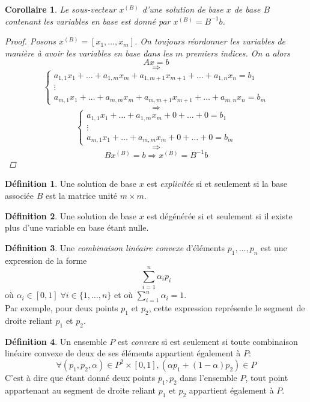 \documentclass[a4paper]{report}
\theoremstyle{definition}
\newtheorem*{definition}{Définition}
\theoremstyle{remark}
\theoremstyle{plain}
\newtheorem{corollary}{Corollaire}
\begin{document}
\begin{corollary}
Le sous-vecteur \(x^{(B)}\) d'une solution de base \(x\) de base \(B\) contenant
les variables en base est donné par \(x^{(B)}=B^{-1}b\).
\begin{proof}
Posons \(x^{(B)}=[x_1,\dots,x_m]\). On toujours réordonner les variables de
manière à avoir les variables en base dans les \(m\) premiers indices. On a
alors
\[Ax=b\]
\[\Rightarrow\]
\[\begin{cases}
	a_{1,1}x_1+\dots+a_{1,m}x_m+a_{1,m+1}x_{m+1}+\dots+a_{1,n}x_n=b_1\\
	\vdots\\
	a_{m,1}x_1+\dots+a_{m,m}x_m+a_{m,m+1}x_{m+1}+\dots+a_{m,n}x_n=b_m
\end{cases}\]
\[\Rightarrow\]
\[\begin{cases}
	a_{1,1}x_1+\dots+a_{1,m}x_m+0+\dots+0=b_1\\
	\vdots\\
	a_{m,1}x_1+\dots+a_{m,m}x_m+0+\dots+0=b_m
\end{cases}\]
\[\Rightarrow\]
\[Bx^{(B)}=b\Rightarrow x^{(B)}=B^{-1}b\]
\end{proof}
\end{corollary}

\begin{definition}
Une solution de base \(x\) est \emph{explicitée} si et
seulement si la base associée \(B\) est la matrice unité \(m\times m\).
\end{definition}

\begin{definition}
Une solution de base \(x\) est dégénérée si et seulement si il existe plus d'une
variable en base étant nulle.
\end{definition}

\begin{definition}
Une \emph{combinaison linéaire convexe} d'éléments \(p_1,\dots,p_n\) est
une expression de la forme \[\sum_{i=1}^n\alpha_ip_i\] où \(\alpha_i\in[0,1]
\;\forall i\in\{1,\dots,n\}\) et où \(\sum_{i=1}^n\alpha_i=1\). \\
Par exemple, pour deux points \(p_1\) et \(p_2\), cette expression représente le
segment de droite reliant \(p_1\) et \(p_2\).
\end{definition}

\begin{definition}
Un ensemble \(P\) est \emph{convexe} si est seulement si toute combinaison
linéaire convexe de deux de ses éléments appartient également à \(P\):
\[\forall (p_1, p_2,\alpha)\in P^2\times[0,1],(\alpha p_1+(1-\alpha)p_2)\in P\]
C'est à dire que étant donné deux points \(p_1,p_2\) dans l'ensemble \(P\),
tout point appartenant au segment de droite reliant \(p_1\) et \(p_2\)
appartient également à \(P\).
\end{definition}
\end{document}
